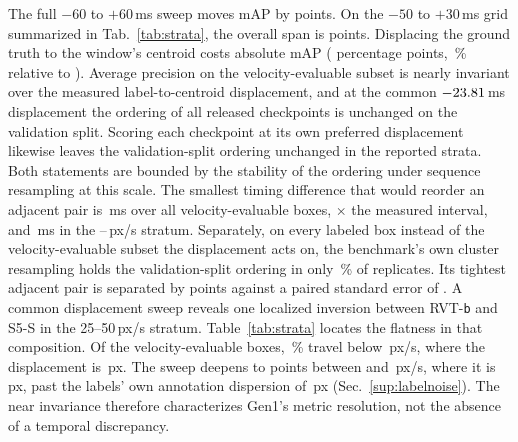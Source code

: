 \documentclass[10pt,twocolumn,letterpaper]{article}
\begin{document}
The full $-60$ to $+60$\,ms sweep moves mAP by \mapSweepSpan{} points. On the
$-50$ to $+30$\,ms grid summarized in Tab.~\ref{tab:strata}, the overall
span is \stSpanAll{} points. Displacing the ground truth to the window's centroid
costs \mapCostAbs{} absolute mAP (\mapCost{} percentage points,
\mapCostPct\,\% relative to \mapZero{}). Average precision on the velocity-evaluable
subset is nearly invariant over the measured label-to-centroid displacement, and at
the common $-23.81$\,ms displacement the ordering of all
\rankCkpts{} released checkpoints is unchanged on the validation split. Scoring each checkpoint at its own
preferred displacement likewise leaves the validation-split ordering unchanged in the reported
strata. Both statements are bounded by the stability of the
ordering under sequence resampling at this scale. The smallest timing difference that would reorder an adjacent
pair is \dstarAll\,ms over all velocity-evaluable boxes,
\dstarAllTau$\times$ the measured interval, and \dstarMid\,ms in the
\mapCutMid--\mapCutHi\,px/s stratum. Separately, on every labeled box instead of the
velocity-evaluable subset the displacement acts on, the benchmark's own cluster resampling
holds the validation-split ordering in only \rankHoldBox\,\% of replicates. Its tightest
adjacent pair is separated by \rankGapMin{} points against a paired standard error of
\rankGapMinSE{}. A common displacement sweep reveals one localized
inversion between RVT-\texttt{b} and S5-S in the 25--50\,px/s stratum.
Table~\ref{tab:strata} locates the
flatness in that composition. Of the velocity-evaluable boxes, \stShareSlow\,\% travel below
\mapCutLo\,px/s, where the displacement is \stPxSlow\,px. The sweep deepens
to \mapSpanHigh{} points between \mapCutMid{} and \mapCutHi\,px/s, where it is
\stPxHigh\,px, past the labels' own annotation dispersion of
\,px (Sec.~\ref{sup:labelnoise}).
The near invariance therefore characterizes Gen1's metric resolution, not the absence of a
temporal discrepancy.
\end{document}
